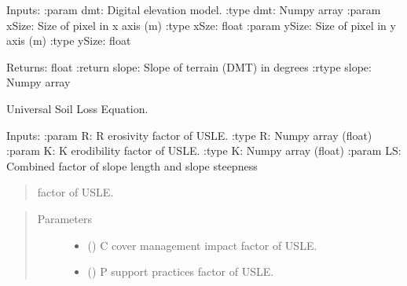 \documentclass[letterpaper,10pt,english]{sphinxmanual}
\begin{document}
\begin{fulllineitems}
\begin{fulllineitems}
Inputs:
:param dmt: Digital elevation model.
:type dmt: Numpy array
:param xSize: Size of pixel in x axis (m)
:type xSze: float
:param ySize: Size of pixel in y axis (m)
:type ySize: float

Returns: float
:return slope: Slope of terrain (DMT) in degrees
:rtype slope: Numpy array

\end{fulllineitems}


\begin{fulllineitems}
\label{\detokenize{libs:usle.RadUSLE.usle}}
Universal Soil Loss Equation.

Inputs:
:param R: R erosivity factor of USLE.
:type R: Numpy array (float)
:param K: K erodibility factor of USLE.
:type K: Numpy array (float)
:param LS: Combined factor of slope length and slope steepness
\begin{quote}

factor of USLE.
\end{quote}
\begin{quote}\begin{description}
\item[{Parameters}] \leavevmode\begin{itemize}
\item {} 
 (\sphinxstyleliteralemphasis{\sphinxupquote{ (}}\sphinxstyleliteralemphasis{\sphinxupquote{)}}) \textendash{} C cover management impact factor of USLE.

\item {} 
 (\sphinxstyleliteralemphasis{\sphinxupquote{ (}}) \textendash{} P support practices factor of USLE.

\end{itemize}

\end{description}\end{quote}


\end{fulllineitems}
\end{fulllineitems}
\end{document}
